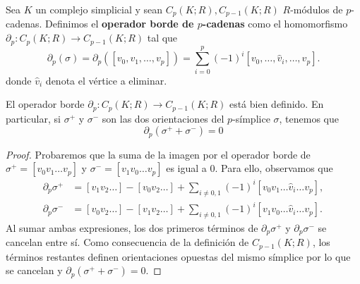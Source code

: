 \begin{definicion}
	Sea \(K\) un complejo simplicial y sean \(C_{p}(K;R), C_{p-1}(K;R)\) \(R\)-módulos de
	\(p\)-cadenas. Definimos el \textbf{operador borde de \(p\)-cadenas} como el homomorfismo
	\(\partial_{p}: C_{p}(K;R) \to C_{p-1}(K;R)\) tal que
	\[
	\partial_{p}(\sigma) = \partial_{p}([v_{0}, v_{1}, \ldots, v_{p}]) = \sum_{i=0}
	^{p}(-1)^{i}[v_{0}, \ldots, \hat{v}_{i}, \ldots, v_{p}] .
	\]
	donde \(\hat{v}_{i}\) denota el vértice a eliminar.
\end{definicion}
%
\begin{lema}
	El operador borde \(\partial_{p}: C_{p}(K;R) \to C_{p-1}(K;R)\) está bien definido.
	En particular, si \(\sigma^{+}\) y \(\sigma^{-}\) son las dos orientaciones del \(p\)-símplice
	\(\sigma\), tenemos que
	\[
	\partial_{p}(\sigma^{+}+\sigma^{-}) = 0
	\]
\end{lema}
\begin{proof}
	Probaremos que la suma de la imagen por el operador borde de \(\sigma^{+}= [v_{0}
	v_{1}\ldots v_{p}]\) y \(\sigma^{-}= [v_{1}v_{0}\ldots v_{p}]\) es igual a \(0\).
	Para ello, observamos que
	\begin{align*}
		\partial_{p}\sigma^{+} & = [v_{1}v_{2}\ldots] - [v_{0}v_{2}\ldots] + \sum_{i\ne0,1}(-1)^{i}[v_{0}v_{1}\ldots \hat{v}_{i}\ldots v_{p}], \\
		\partial_{p}\sigma^{-} & = [v_{0}v_{2}\ldots] - [v_{1}v_{2}\ldots] + \sum_{i\ne0,1}(-1)^{i}[v_{1}v_{0}\ldots \hat{v}_{i}\ldots v_{p}].
	\end{align*}
	Al sumar ambas expresiones, los dos primeros términos de
	\(\partial_{p}\sigma^{+}\) y \(\partial_{p}\sigma^{-}\) se cancelan entre sí. Como
	consecuencia de la definición de \(C_{p-1}(K;R)\), los términos restantes
	definen orientaciones opuestas del mismo símplice por lo que se cancelan y
	\(\partial_{p}(\sigma^{+}+\sigma^{-})=0\).
\end{proof}

